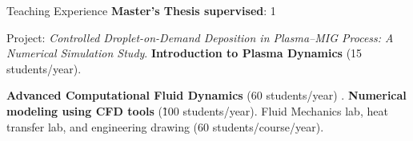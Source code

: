 \begin{rubric}{Teaching Experience}
\entry*[2022]%
	\textbf{Master's Thesis supervised}: 1 \par
	 {Project}: \emph{Controlled Droplet-on-Demand Deposition in Plasma–MIG Process: A Numerical Simulation Study}. %
\entry*[2023] \textbf{Introduction to Plasma Dynamics} (15 students/year).%
{}\par
\entry*[2014-2020] \textbf{Advanced Computational Fluid Dynamics} (60 students/year) .%
\entry*[2014-2020] \textbf{Numerical modeling using CFD tools} (\~100 students/year).%
\entry*[2012-2014] Fluid Mechanics lab, heat transfer lab, and engineering drawing (60 students/course/year).
\end{rubric}